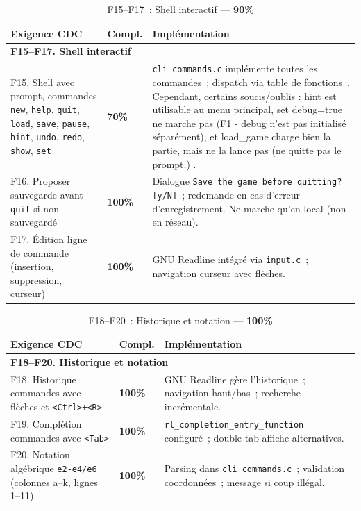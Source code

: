 \documentclass[a4paper]{article}
\begin{document}
\begin{table}[H]
\centering
\renewcommand{\arraystretch}{1.4}
\begin{tabular}{|p{6cm}|p{1.5cm}|p{8cm}|}
\hline
\textbf{Exigence CDC} & \textbf{Compl.} & \textbf{Implémentation} \\
\hline
\multicolumn{3}{|l|}{\textbf{F15--F17. Shell interactif}} \\
\hline
F15. Shell avec prompt, commandes \texttt{new}, \texttt{help}, \texttt{quit}, \texttt{load}, \texttt{save}, \texttt{pause}, \texttt{hint}, \texttt{undo}, \texttt{redo}, \texttt{show}, \texttt{set}
& \textbf{70\%}
& \texttt{cli\_commands.c} implémente toutes les commandes~; dispatch via table de fonctions~. Cependant, certains soucis/oublis : hint est utilisable au menu principal, set debug=true ne marche pas (F1 - debug n'est pas initialisé séparément), et load\_game charge bien la partie, mais ne la lance pas (ne quitte pas le prompt.) . \\
\hline
F16. Proposer sauvegarde avant \texttt{quit} si non sauvegardé
& \textbf{100\%}
& Dialogue \texttt{Save the game before quitting? [y/N]}~; redemande en cas d'erreur d'enregistrement. Ne marche qu'en local (non en réseau).\\
\hline
F17. Édition ligne de commande (insertion, suppression, curseur)
& \textbf{100\%}
& GNU Readline intégré via \texttt{input.c}~; navigation curseur avec flèches. \\
\hline
\end{tabular}
\caption{F15--F17~: Shell interactif --- \textbf{90\%}}
\label{tab:f15-f17}
\end{table}
 
 
\begin{table}[H]
\centering
\renewcommand{\arraystretch}{1.4}
\begin{tabular}{|p{6cm}|p{1.5cm}|p{8cm}|}
\hline
\textbf{Exigence CDC} & \textbf{Compl.} & \textbf{Implémentation} \\
\hline
\multicolumn{3}{|l|}{\textbf{F18--F20. Historique et notation}} \\
\hline
F18. Historique commandes avec flèches et \texttt{<Ctrl>+<R>}
& \textbf{100\%}
& GNU Readline gère l'historique~; navigation haut/bas~; recherche incrémentale. \\
\hline
F19. Complétion commandes avec \texttt{<Tab>}
& \textbf{100\%}
& \texttt{rl\_completion\_entry\_function} configuré~; double-tab affiche alternatives. \\
\hline
F20. Notation algébrique \texttt{e2-e4/e6} (colonnes a--k, lignes 1--11)
& \textbf{100\%}
& Parsing dans \texttt{cli\_commands.c}~; validation coordonnées~; message si coup illégal. \\
\hline
\end{tabular}
\caption{F18--F20~: Historique et notation --- \textbf{100\%}}
\label{tab:f18-f20}
\end{table}
 
\end{document}
